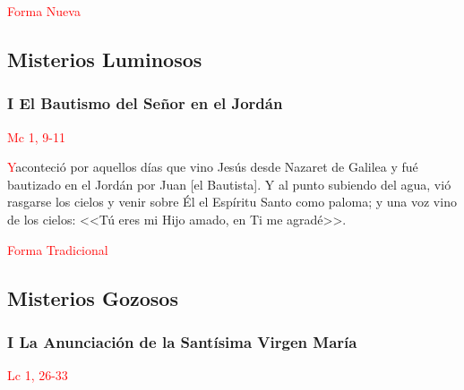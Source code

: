 \documentclass[10pt,twoside]{book}
\begin{document}
\begin{paracol}{2}
      \begin{leftcolumn}
            \begin{center}
                  \textcolor{red}{Forma Nueva}
                  \subsection*{Misterios Luminosos}
            \end{center}

            \noindent\subsubsection*{I El Bautismo del Señor en el Jordán}

            \vspace{-0.5em}

            \hfill\textcolor{red}{Mc 1, 9-11}

            \lettrine[lines=2]{\textcolor{red}{Y}}\space aconteció por aquellos días que vino Jesús desde Nazaret de Galilea y fué bautizado en el Jordán por Juan [el Bautista].
            Y al punto subiendo del agua, vió rasgarse los cielos y venir sobre Él el Espíritu Santo como paloma; y una voz vino de los cielos: 
            <<Tú eres mi Hijo amado, en Ti me agradé>>.
      \end{leftcolumn}
      \begin{rightcolumn}
            \begin{center}
                  \textcolor{red}{Forma Tradicional}
                  \subsection*{Misterios Gozosos }
            \end{center}

            \noindent\subsubsection*{I La Anunciación de la Santísima Virgen María}

            \vspace{-0.5em}

            \hfill\textcolor{red}{Lc 1, 26-33}


\end{rightcolumn}
\end{paracol}
\end{document}
